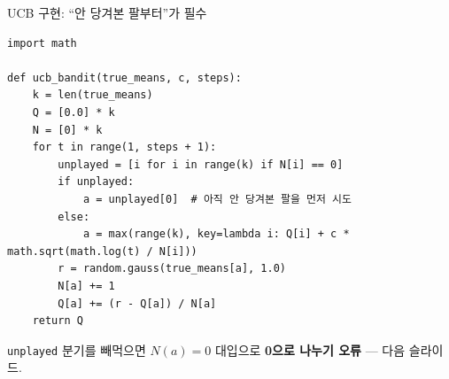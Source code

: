 \documentclass[aspectratio=169,11pt]{beamer}
\begin{document}

\begin{frame}[fragile]{UCB 구현: ``안 당겨본 팔부터''가 필수}
\begin{lstlisting}
import math

def ucb_bandit(true_means, c, steps):
    k = len(true_means)
    Q = [0.0] * k
    N = [0] * k
    for t in range(1, steps + 1):
        unplayed = [i for i in range(k) if N[i] == 0]
        if unplayed:
            a = unplayed[0]  # 아직 안 당겨본 팔을 먼저 시도
        else:
            a = max(range(k), key=lambda i: Q[i] + c * math.sqrt(math.log(t) / N[i]))
        r = random.gauss(true_means[a], 1.0)
        N[a] += 1
        Q[a] += (r - Q[a]) / N[a]
    return Q
\end{lstlisting}
{\footnotesize \texttt{unplayed} 분기를 빼먹으면 $N(a)=0$ 대입으로
\textbf{0으로 나누기 오류} --- 다음 슬라이드.}
\end{frame}
\end{document}
